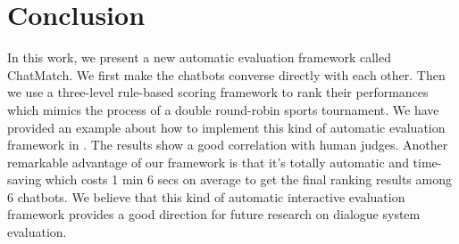 \section{Conclusion}
\label{sec:conclude}
In this work, we present a new automatic evaluation framework called ChatMatch. 
We first make the chatbots converse directly with each other. 
Then we use a three-level rule-based scoring framework to rank their performances which mimics the process of a double round-robin sports tournament. 
We have provided an example about how to implement this kind of automatic evaluation framework in . 
The results show a good correlation with human judges. 
Another remarkable advantage of our framework is that it's totally automatic and time-saving which costs 1 min 6 secs on average to get the final ranking results among 6 chatbots. 
We believe that this kind of automatic interactive evaluation framework provides a good direction for future research on dialogue system evaluation.
